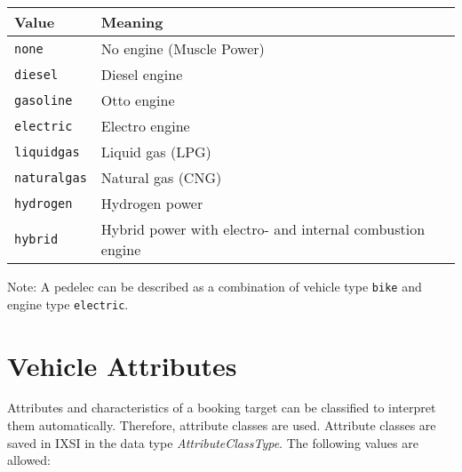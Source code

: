 \begin{flushleft}
\begin{tabularx}{\linewidth}{l>{\raggedright\arraybackslash}X}
\toprule
Value & Meaning\\
\midrule
\verb|none| & No engine (Muscle Power)\\
\verb|diesel| & Diesel engine\\
\verb|gasoline| & Otto engine\\
\verb|electric| & Electro engine\\
\verb|liquidgas| & Liquid gas (LPG)\\
\verb|naturalgas| & Natural gas (CNG)\\
\verb|hydrogen| & Hydrogen power\\
\verb|hybrid| & Hybrid power with electro- and internal combustion engine\\
\bottomrule
\end{tabularx}
\end{flushleft}

Note: A pedelec can be described as a combination of vehicle type \verb|bike| and engine type \verb|electric|.

\section{Vehicle Attributes}
\label{sec:CodeTabellen:AttributeClass}
Attributes and characteristics of a booking target can be classified to interpret them automatically. Therefore, attribute classes are used. Attribute classes are saved in IXSI in the data type \emph{AttributeClassType}. The following values are allowed:

